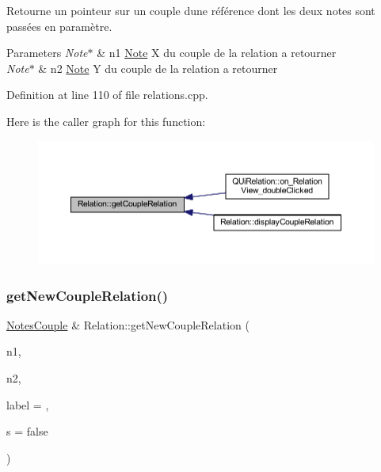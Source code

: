 Retourne un pointeur sur un couple d\textquotesingle{}une référence dont les deux notes sont passées en paramètre. 


\begin{DoxyParams}{Parameters}
{\em Note$\ast$} & n1 \hyperlink{class_note}{Note} X du couple de la relation a retourner \\
\hline
{\em Note$\ast$} & n2 \hyperlink{class_note}{Note} Y du couple de la relation a retourner \\
\hline
\end{DoxyParams}


Definition at line 110 of file relations.\+cpp.

Here is the caller graph for this function\+:\nopagebreak
\begin{figure}[H]
\begin{center}
\leavevmode
\includegraphics[width=350pt]{class_relation_a086c39ecf396e3cfcb465fd9eea5a904_icgraph}
\end{center}
\end{figure}
\mbox{\label{class_relation_a69211cc18aed20c1df97c4b73317a2e1}} 
\subsubsection{\texorpdfstring{get\+New\+Couple\+Relation()}{getNewCoupleRelation()}}
{\footnotesize\ttfamily \hyperlink{class_notes_couple}{Notes\+Couple} \& Relation\+::get\+New\+Couple\+Relation (\begin{DoxyParamCaption}\item[{\hyperlink{class_note}{Note} $\ast$}]{n1,  }\item[{\hyperlink{class_note}{Note} $\ast$}]{n2,  }\item[{Q\+String}]{label = {},  }\item[{bool}]{s = {\ttfamily false} }\end{DoxyParamCaption})}



